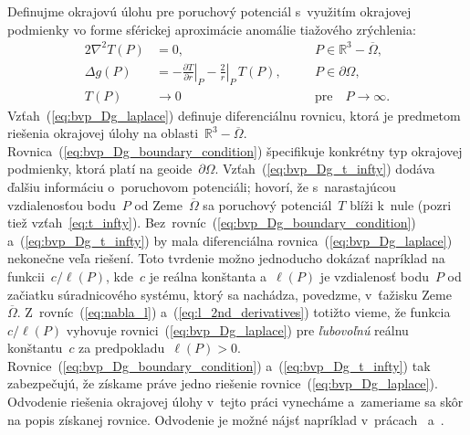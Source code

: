\documentclass[a4paper, 12pt]{book}
\begin{document}
Definujme okrajovú úlohu pre poruchový potenciál s~využitím okrajovej podmienky 
vo forme sférickej aproximácie anomálie tiažového zrýchlenia:
%
\begin{alignat}{2}
\nabla^2 T(P) &= 0{,} &&P \in \mathbb{R}^3 
- \overline\Omega{,}\label{eq:bvp_Dg_laplace}\\
\Delta g(P) &= -\left.\frac{\partial T}{\partial r}\right|_P 
- \left.\frac{2}{r}\right|_P \, T(P){,} \quad &&P \in 
\partial\Omega{,}\label{eq:bvp_Dg_boundary_condition}\\
T(P) &\rightarrow 0 &&\textrm{pre} \quad P \rightarrow 
\infty{.}\label{eq:bvp_Dg_t_infty}
\end{alignat}
%
Vzťah~(\ref{eq:bvp_Dg_laplace}) definuje diferenciálnu rovnicu, ktorá je 
predmetom riešenia okrajovej úlohy na oblasti~$\mathbb{R}^3 - \overline\Omega$.  
Rovnica~(\ref{eq:bvp_Dg_boundary_condition}) špecifikuje konkrétny typ 
okrajovej podmienky, ktorá platí na geoide~$\partial\Omega$.  
Vzťah~(\ref{eq:bvp_Dg_t_infty}) dodáva ďalšiu informáciu o~poruchovom 
potenciáli; hovorí, že s~narastajúcou vzdialenosťou bodu~$P$ od 
Zeme~$\overline\Omega$ sa poruchový potenciál~$T$ blíži k~nule (pozri tiež 
vzťah~\ref{eq:t_infty}).  Bez~rovníc~(\ref{eq:bvp_Dg_boundary_condition}) 
a~(\ref{eq:bvp_Dg_t_infty}) by mala diferenciálna 
rovnica~(\ref{eq:bvp_Dg_laplace}) nekonečne veľa riešení.  Toto tvrdenie možno 
jednoducho dokázať napríklad na funkcii~$c \slash \ell(P)$, kde~$c$ je reálna 
konštanta a~$\ell(P)$ je vzdialenosť bodu~$P$ od začiatku súradnicového 
systému, ktorý sa nachádza, povedzme, v~ťažisku Zeme~$\overline\Omega$.  
Z~rovníc~(\ref{eq:nabla_l}) a~(\ref{eq:l_2nd_derivatives}) totižto vieme, že 
funkcia~$c \slash \ell(P)$ vyhovuje rovnici~(\ref{eq:bvp_Dg_laplace}) pre 
\emph{ľubovoľnú} reálnu konštantu~$c$ za predpokladu~$\ell(P) > 0$.  
Rovnice~(\ref{eq:bvp_Dg_boundary_condition}) a~(\ref{eq:bvp_Dg_t_infty}) tak 
zabezpečujú, že získame práve jedno riešenie rovnice~(\ref{eq:bvp_Dg_laplace}).  
Odvodenie riešenia okrajovej úlohy v~tejto práci vynecháme a~zameriame sa skôr 
na popis získanej rovnice.  Odvodenie je možné nájsť napríklad 
v~prácach~\textcite{MoritzPhysicalGeodesy} a~\textcite{Janak2006}.
\end{document}
